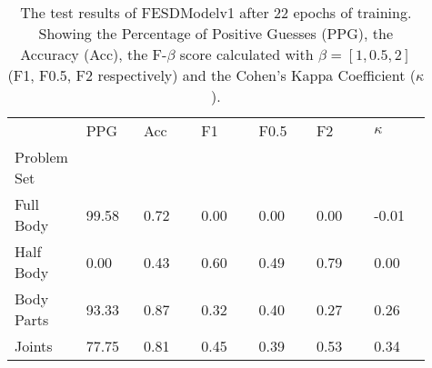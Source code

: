     \begin{table}[!htbp]
        \caption[Test Results of FESDModelv1]{The test results of FESDModelv1 after 22 epochs of training. Showing the Percentage of Positive Guesses (PPG), the Accuracy (Acc), the F-$\beta$ score calculated with $\beta = [1, 0.5, 2]$ (F1, F0.5, F2 respectively) and the Cohen's Kappa Coefficient ($\kappa$).}
        \label{tab:res_v1}
        \begin{tabular}{p{0.13\linewidth}p{0.13\linewidth}p{0.13\linewidth}p{0.13\linewidth}p{0.13\linewidth}p{0.13\linewidth}p{0.13\linewidth}}
\hline
{} &   PPG &  Acc &   F1 &  F0.5 &   F2 &  $\kappa$ \\
Problem Set   &       &      &      &       &      &           \\
\hline
Full Body  & 99.58 & 0.72 & 0.00 &  0.00 & 0.00 &     -0.01 \\
Half Body  &  0.00 & 0.43 & 0.60 &  0.49 & 0.79 &      0.00 \\
Body Parts & 93.33 & 0.87 & 0.32 &  0.40 & 0.27 &      0.26 \\
Joints     & 77.75 & 0.81 & 0.45 &  0.39 & 0.53 &      0.34 \\
\hline
\end{tabular}

    \end{table}
  